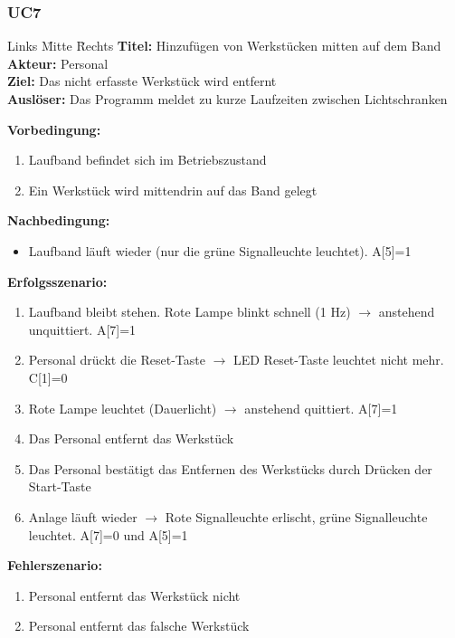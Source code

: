 \documentclass[oneside,a4paper,titlepage]{scrartcl} %
\begin{document}
\subsubsection{UC7}
\begin{tabbing}
 Links \= Mitte \= Rechts \kill
 \textbf{Titel:} \> \> Hinzufügen von Werkstücken mitten auf dem Band\\
 \textbf{Akteur:} \> \> Personal\\
 \textbf{Ziel:} \> \> Das nicht erfasste Werkstück wird entfernt\\
 \textbf{Auslöser:} \> \> Das Programm meldet zu kurze Laufzeiten zwischen Lichtschranken\\
\end{tabbing}
\textbf{Vorbedingung:}
\begin{enumerate}
 \item Laufband befindet sich im Betriebszustand
 \item Ein Werkstück wird mittendrin auf das Band gelegt
\end{enumerate}
\textbf{Nachbedingung:}
\begin{itemize}
 \item Laufband läuft wieder (nur die grüne Signalleuchte leuchtet). A[5]=1
\end{itemize}

\textbf{Erfolgsszenario:}
\begin{enumerate}
 \item Laufband bleibt stehen. Rote Lampe blinkt schnell (1 Hz) $\rightarrow$ anstehend unquittiert. A[7]=1
 \item Personal drückt die Reset-Taste $\rightarrow$ LED Reset-Taste leuchtet nicht mehr. C[1]=0
 \item Rote Lampe leuchtet (Dauerlicht) $\rightarrow$ anstehend quittiert. A[7]=1
 \item Das Personal entfernt das Werkstück
 \item Das Personal bestätigt das Entfernen des Werkstücks durch Drücken der Start-Taste
 \item Anlage läuft wieder $\rightarrow$ Rote Signalleuchte erlischt, grüne Signalleuchte leuchtet. A[7]=0 und A[5]=1
\end{enumerate}
\textbf{Fehlerszenario:}
\begin{enumerate}
    \item Personal entfernt das Werkstück nicht
    \item Personal entfernt das falsche Werkstück
\end{enumerate}
\end{document}
